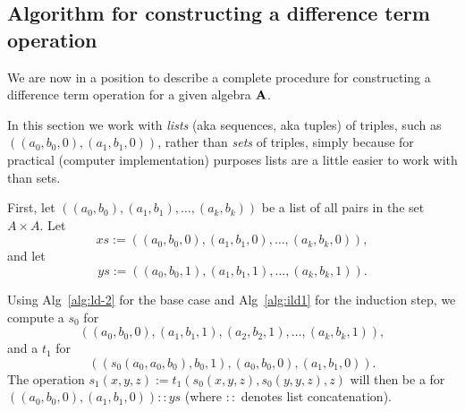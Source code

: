   
  
  
  
  
  
  
  
  
  \subsection{Algorithm for constructing a difference term operation}
  \label{sec:algor-2}
  We are now in a position to describe a complete procedure for constructing
  a difference term operation for a given algebra $\mathbf{A}$.
  
  In this section we work with \emph{lists}
  (aka sequences, aka tuples) of triples,
  such as $((a_0, b_0, 0), (a_1, b_1, 0))$, rather than \emph{sets} of triples,
  simply because for practical (computer implementation) purposes lists are a little
  easier to work with than sets.
  
  First, let
  $((a_0, b_0), (a_1, b_1), \dots, (a_k, b_k))$
  be a list of all pairs in the set $A\times A$.
  Let
  \begin{equation*}
  xs := %
  ((a_0, b_0, 0), (a_1, b_1, 0), \dots, (a_k, b_k, 0)),
  \end{equation*}
  and let
  \begin{equation*}
  ys := %
  ((a_0, b_0, 1), (a_1, b_1, 1), \dots, (a_k, b_k, 1)).
  \end{equation*}
  
  
  Using Alg~\ref{alg:ld-2} for the base case
  and Alg~\ref{alg:ild1}
  for the induction step,
  we compute a \ldto $s_0$ for
  \begin{equation*}
  ((a_0, b_0, 0), (a_1, b_1, 1), (a_2, b_2, 1), \dots, (a_k, b_k, 1)),
  \end{equation*}
  and a \ldto $t_1$ for
  \begin{equation*}
  ((s_0(a_0, a_0, b_0), b_0, 1), (a_0, b_0, 0),(a_1, b_1, 0)).
  \end{equation*}
  The operation $s_1(x,y,z) := t_1(s_0(x,y,z), s_0(y,y,z), z)$ will then be
  a \ldto for
  $((a_0, b_0, 0), (a_1, b_1, 0)) :: ys$  (where $::$ denotes
  list concatenation).
  
